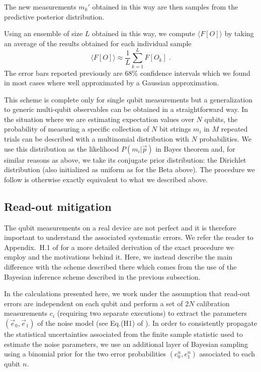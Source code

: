 \documentclass[10pt]{article}
\begin{document}
The new measurements $m_k'$ obtained in this way are then samples from the predictive posterior distribution.

Using an ensemble of size $L$ obtained in this way, we compute $\langle F[O]\rangle$ by taking an average of the results obtained for each individual sample
\begin{equation}
\langle F[O]\rangle \approx \frac{1}{L} \sum_{k=1}^L F[O_k]\;.
\end{equation}
The error bars reported previously are $68\%$ confidence intervals which we found in most cases where well approximated by a Gaussian approximation.

This scheme is complete only for single qubit measurements but a generalization to generic multi-qubit observables can be obtained in a straightforward way. In the situation where we are estimating expectation values over $N$ qubits, the probability of measuring  a specific collection of $N$ bit strings $m_i$ in $M$ repeated trials can be described with a multinomial distribution with $N$ probabilities. We use this distribution as the likelihood $P(m_i|\vec{p})$ in Bayes theorem and, for similar reasons as above, we take its conjugate prior distribution: the Dirichlet distribution (also initialized as uniform as for the Beta above). The procedure we follow is otherwise exactly equivalent to what we described above.

\subsection{Read-out mitigation}
The qubit measurements on a real device are not perfect and it is therefore important to understand the associated systematic errors. We refer the reader to Appendix.~H.1 of \cite{Roggero_nptodg} for a more detailed derivation of the exact procedure we employ and the motivations behind it. Here, we instead describe the main difference with the scheme described there which comes from the use of the Bayesian inference scheme described in the previous subsection.

In the calculations presented here, we work under the assumption that read-out errors are independent on each qubit and perform a set of $2N$ calibration measurements $c_i$ (requiring two separate executions) to extract the parameters $(\vec{e}_0,\vec{e}_1)$ of the noise model (see Eq.(H1) of \cite{Roggero_nptodg}). In order to consistently propagate the statistical uncertainties associated from the finite sample statistic used to estimate the noise parameters, we use an additional layer of Bayesian sampling using a binomial prior for the two error probabilities $(e^n_0,e^n_1)$ associated to each qubit $n$. 
\end{document}
